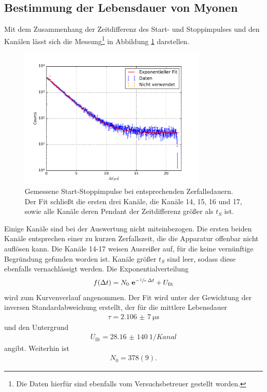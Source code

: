 \subsection{Bestimmung der Lebensdauer von Myonen}
Mit dem Zusammenhang der Zeitdifferenz des Start- und Stoppimpulses und den Kanälen lässt sich die Messung\footnote[2]{Die Daten hierfür sind ebenfalls
vom Versuchsbetreuer gestellt worden.} in Abbildung \ref{pic:lebensdauer} darstellen.
\begin{figure}[t]
 \includegraphics[width=0.8\textwidth]{../pics/lebensdauer_fit}
 \caption{Gemessene Start-Stoppimpulse bei entsprechenden Zerfallsdauern. Der Fit schließt die ersten drei Kanäle, die Kanäle 14, 15, 16 und 17, sowie
 alle Kanäle deren Pendant der Zeitdifferenz größer als $t_S$ ist.}
 \label{pic:lebensdauer}
\end{figure}
Einige Kanäle sind bei der Auswertung nicht miteinbezogen. Die ersten beiden Kanäle entsprechen einer zu kurzen Zerfallszeit,
die die Apparatur offenbar nicht auflösen kann. Die Kanäle 14-17 weisen Ausreißer auf, für die keine vernünftige Begründung gefunden worden ist.
Kanäle größer $t_S$ sind leer, sodass diese ebenfalls vernachlässigt werden.
Die Exponentialverteilung
\begin{align}
 f(\Delta t) = N_0 \ \mathbf{e}^{-{\sfrac{1}{\tau}}\,\Delta t} + U_\text{fit}
\end{align}
wird zum Kurvenverlauf angenommen. Der Fit wird unter der Gewichtung der inversen Standardabweichung erstellt,
der für die mittlere Lebensdauer
\begin{align}
 \tau = \SI{2,106(7)}{\micro\second}
 \label{eq:tau}
\end{align}
und den Untergrund
\begin{align}
 U_\text{fit} = \SI{28,16(140)}{1\per Kanal}
 \label{eq:backgrExp}
\end{align}
angibt. Weiterhin ist
\begin{align}
 N_0 = 378(9).
\end{align}

